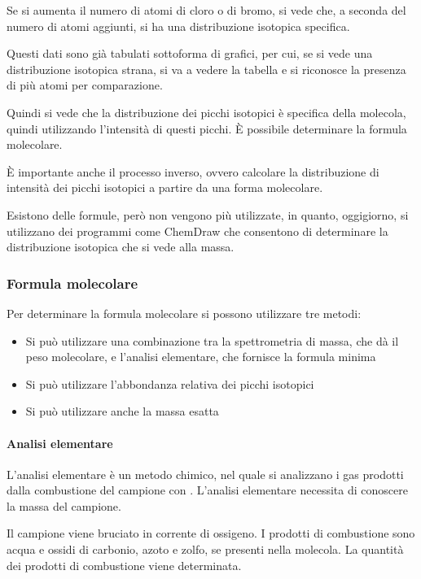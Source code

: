 Se si aumenta il numero di atomi di cloro o di bromo, si vede che, a
seconda del numero di atomi aggiunti, si ha una distribuzione isotopica
specifica.


Questi dati sono già tabulati sottoforma di grafici, per cui, se si vede
una distribuzione isotopica strana, si va a vedere la tabella e si
riconosce la presenza di più atomi per comparazione.


Quindi si vede che la distribuzione dei picchi isotopici è specifica
della molecola, quindi utilizzando l'intensità di questi picchi. È
possibile determinare la formula molecolare.

È importante anche il processo inverso, ovvero calcolare la
distribuzione di intensità dei picchi isotopici a partire da una forma
molecolare.

Esistono delle formule, però non vengono più utilizzate, in quanto,
oggigiorno, si utilizzano dei programmi come ChemDraw che consentono di
determinare la distribuzione isotopica che si vede alla massa.

\subsubsection{Formula molecolare}

Per determinare la formula molecolare si possono utilizzare tre metodi:
\begin{itemize}
  \item Si può utilizzare una combinazione tra la spettrometria di massa, che
  dà il peso molecolare, e l'analisi elementare, che fornisce la formula
  minima
  \item Si può utilizzare l'abbondanza relativa dei picchi isotopici
  \item Si può utilizzare anche la massa esatta
\end{itemize}

\paragraph{Analisi elementare}

L'analisi elementare è un metodo chimico, nel quale si analizzano i gas
prodotti dalla combustione del campione con . L'analisi elementare
necessita di conoscere la massa del campione.

Il campione viene bruciato in corrente di ossigeno. I prodotti di
combustione sono acqua e ossidi di carbonio, azoto e zolfo, se presenti
nella molecola. La quantità dei prodotti di combustione viene
determinata.

